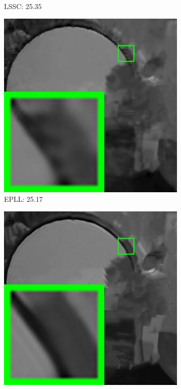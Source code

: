 \begin{figure}
\begin{subfigure}[t]{0.24\textwidth}
		\caption{LSSC: 25.35}
    \end{subfigure}
    \hfill
    \begin{subfigure}[t]{0.24\textwidth}
        \centering
        \includegraphics[width=1\textwidth]{images/pgpd/200img/br_NCSR_75_5096.jpg}
		\caption{EPLL: 25.17}
    \end{subfigure}
    \hfill
    \begin{subfigure}[t]{0.24\textwidth}
        \centering
        \includegraphics[width=1\textwidth]{images/pgpd/200img/br_WNNM_75_5096.jpg}

\end{subfigure}
\end{figure}
